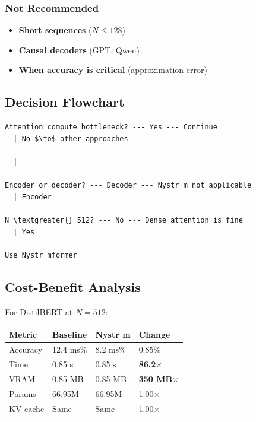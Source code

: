 \subsubsection{Not Recommended}

\begin{itemize}
\item \textbf{Short sequences} ($N \leq 128$)
\item \textbf{Causal decoders} (GPT, Qwen)
\item \textbf{When accuracy is critical} (approximation error)

\end{itemize}
\subsection{Decision Flowchart}

\begin{lstlisting}
Attention compute bottleneck? --- Yes --- Continue
  | No $\to$ other approaches

  |
   
Encoder or decoder? --- Decoder --- Nystr m not applicable
  | Encoder
   
N \textgreater{} 512? --- No --- Dense attention is fine
  | Yes
   
Use Nystr mformer
\end{lstlisting}

\subsection{Cost-Benefit Analysis}

For DistilBERT at $N=512$:

\begin{table}[H]
\centering
\small
\begin{tabular}{llll}
\toprule
\textbf{Metric} & \textbf{Baseline} & \textbf{Nystr m} & \textbf{Change} \\
\midrule
Accuracy & 12.4 ms\% & 8.2 ms\% & 0.85\% \\
Time & 0.85 s & 0.85 s & \textbf{86.2$\times$} \\
VRAM & 0.85 MB & 0.85 MB & \textbf{350 MB$\times$} \\
Params & 66.95M & 66.95M & 1.00$\times$ \\
KV cache & Same & Same & 1.00$\times$ \\
\bottomrule
\end{tabular}
\end{table}

